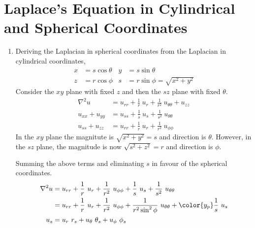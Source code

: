 \section{Laplace's Equation in Cylindrical and Spherical Coordinates}

\begin{enumerate}
    \item Deriving the Laplacian in spherical coordinates from the Laplacian in
          cylindrical coordinates,
          \begin{align}
              x & = s \cos\theta                   &
              y & = s \sin\theta                     \\
              z & = r \cos\phi                     &
              s & = r \sin \phi = \sqrt{x^2 + y^2}
          \end{align}
          Consider the $ xy $ plane with fixed $ z $ and then the $ sz $ plane with
          fixed $ \theta $.
          \begin{align}
              \nabla^2 u      & = u_{rr} + \frac{1}{r}\ u_r + \frac{1}{r^2}
              \ u_{\theta\theta} + u_{zz}                                   \\
              u_{xx} + u_{yy} & = u_{ss} + \frac{1}{s}\ u_s + \frac{1}{s^2}
              \ u_{\theta\theta}                                            \\
              u_{ss} + u_{zz} & = u_{rr} + \frac{1}{r}\ u_r + \frac{1}{r^2}
              \ u_{\phi\phi}
          \end{align}
          In the $ xy $ plane the magnitute is $ \sqrt{x^2 + y^2} = s $ and direction is
          $ \theta $. However, in the $ sz $ plane, the magnitude is now
          $ \sqrt{s^2 + z^2} = r $ and direction is $ \phi $. \par
          Summing the above terms and eliminating $ s $ in favour of the spherical
          coordinates.
          \begin{align}
              \nabla^2 u & = u_{rr} + \frac{1}{r}\ u_r + \frac{1}{r^2}\ u_{\phi\phi}
              + \frac{1}{s}\ u_s + \frac{1}{s^2}\ u_{\theta\theta}                   \\
                         & = u_{rr} + \frac{1}{r}\ u_r + \frac{1}{r^2}\ u_{\phi\phi}
              + \frac{1}{r^2\sin^2\phi}\ u_{\theta\theta}
              + \color{y_p} \frac{1}{s}\ u_s                                         \\
              u_s        & = u_r\ r_s + u_\theta\ \theta_s + u_\phi\ \phi_s          \\

\end{align}
\end{enumerate}
